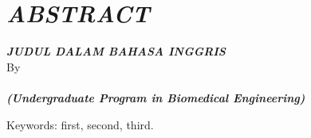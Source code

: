 \clearpage
\chapter*{\textit{ABSTRACT}}

\begin{center}
	
	\linespread{1}
	\large{\bfseries \itshape \MakeUppercase{Judul dalam Bahasa Inggris}}
	\\[\baselineskip]
	
	\normalsize{By\\}
	\large{ 
		\bfseries \theauthor\\
		\itshape (Undergraduate Program in Biomedical Engineering)
	}
	\\[2\baselineskip]
	
\end{center}

\begin{itshape}

\blindtext

Keywords: first, second, third.

\end{itshape}

\clearpage

